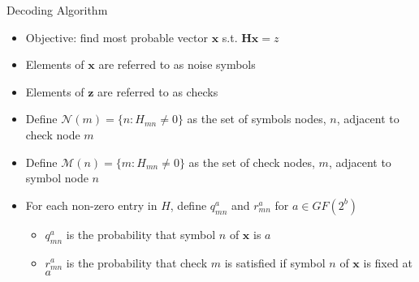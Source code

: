 \documentclass[10pt,ignorenonframetext,]{beamer}
\providecommand{\tightlist}{%
  \setlength{\itemsep}{0pt}\setlength{\parskip}{0pt}}
\begin{document}
\begin{frame}{Decoding Algorithm}
\protect\hypertarget{decoding-algorithm}{}
\begin{itemize}[<+->]
\tightlist
\item
  Objective: find most probable vector \(\textbf{x}\) s.t.
  \(\textbf{Hx}=z\)
\item
  Elements of \(\textbf{x}\) are referred to as noise symbols
\item
  Elements of \(\textbf{z}\) are referred to as checks
\item
  Define \(\mathcal{N}(m) = \{n:H_{mn}\neq 0\}\) as the set of symbols
  nodes, \(n\), adjacent to check node \(m\)
\item
  Define \(\mathcal{M}(n) = \{m:H_{mn}\neq 0\}\) as the set of check
  nodes, \(m\), adjacent to symbol node \(n\)
\item
  For each non-zero entry in \(H\), define \(q_{mn}^a\) and \(r_{mn}^a\)
  for \(a\in GF(2^b)\)

  \begin{itemize}[<+->]
  \tightlist
  \item
    \(q_{mn}^a\) is the probability that symbol \(n\) of \(\textbf{x}\)
    is \(a\)
  \item
    \(r_{mn}^a\) is the probability that check \(m\) is satisfied if
    symbol \(n\) of \(\textbf{x}\) is fixed at \(a\)
  \end{itemize}
\end{itemize}
\end{frame}
\end{document}
